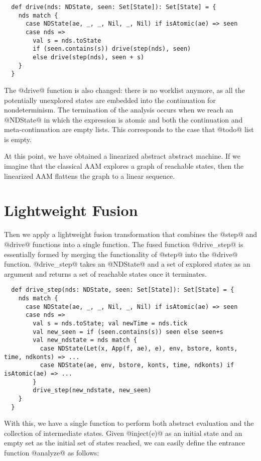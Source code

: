 \documentclass[acmsmall, review]{acmart}\settopmatter{}
\begin{document}
\begin{lstlisting}
  def drive(nds: NDState, seen: Set[State]): Set[State] = {
    nds match {
      case NDState(ae, _, _, Nil, _, Nil) if isAtomic(ae) => seen
      case nds =>
        val s = nds.toState
        if (seen.contains(s)) drive(step(nds), seen)
        else drive(step(nds), seen + s)
    }
  }
\end{lstlisting}

The @drive@ function is also changed: there is no worklist anymore, as all the
potentially unexplored states are embedded into the continuation for
nondeterminism.
The termination of the analysis occurs when we reach an @NDState@ in which the expression
is atomic and both the continuation and meta-continuation are empty lists. This corresponds 
to the case that @todo@ list is empty.

At this point, we have obtained a linearized abstract abstract machine. If we imagine that the
classical AAM explores a graph of reachable states, then the linearized AAM flattens the
graph to a linear sequence.

\section{Lightweight Fusion} \label{fusing}

Then we apply a lightweight fusion transformation that combines the @step@ and @drive@
functions into a single function.
The fused function @drive_step@ is essentially formed by merging the functionality of
@step@ into the @drive@ function.
@drive_step@ takes an @NDState@ and a set of explored states as an argument
and returns a set of reachable states once it terminates.

\begin{lstlisting}
  def drive_step(nds: NDState, seen: Set[State]): Set[State] = {
    nds match {
      case NDState(ae, _, _, Nil, _, Nil) if isAtomic(ae) => seen
      case nds =>
        val s = nds.toState; val newTime = nds.tick
        val new_seen = if (seen.contains(s)) seen else seen+s
        val new_ndstate = nds match {
          case NDState(Let(x, App(f, ae), e), env, bstore, konts, time, ndkonts) => ...
          case NDState(ae, env, bstore, konts, time, ndkonts) if isAtomic(ae) => ...
        }
        drive_step(new_ndstate, new_seen)
    }
  }
\end{lstlisting}

With this, we have a single function to perform both abstract evaluation and the collection of
intermediate states. Given @inject(e)@ as an initial state and an empty set as the
initial set of states reached, we can easily define the entrance function @analyze@ as
follows:
\end{document}

